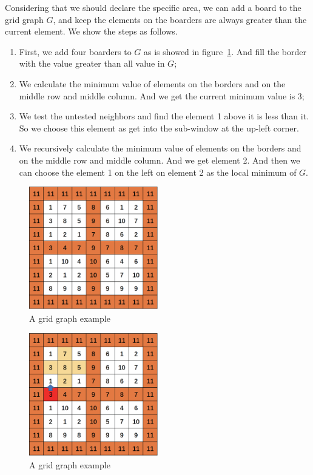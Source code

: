 Considering that we should declare the specific area, we can add a board to the grid graph $G$, and keep the elements on the boarders are always greater than the current element. We show the steps as follows.
\begin{enumerate}
  \item First, we add four boarders to $G$ as is showed in figure~\ref{question_4_example_2}. And fill the border with the value greater than all value in $G$;
  \item We calculate the minimum value of elements on the borders and on the middle row and middle column. And we get the current minimum value is 3;
  \item We test the untested neighbors and find the element 1 above it is less than it. So we choose this element as get into the sub-window at the up-left corner.
  \item We recursively calculate the minimum value of elements on the borders and on the middle row and middle column. And we get element 2. And then we can choose the element 1 on the left on element 2 as the local minimum of $G$.
\end{enumerate}

\begin{figure}[!htbp]
\centering
\includegraphics[width=0.5\textwidth]{figures/6.eps}
\caption{A grid graph example}\label{question_4_example_2}
\end{figure}


\begin{figure}[!htbp]
\centering
\includegraphics[width=0.5\textwidth]{figures/7.eps}
\caption{A grid graph example}\label{question_4_example_3}
\end{figure}


